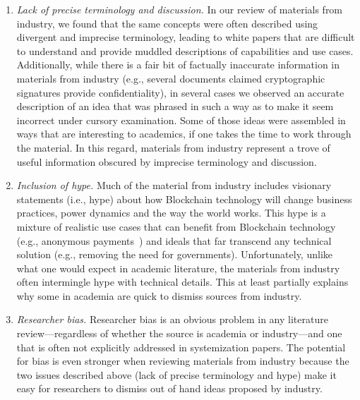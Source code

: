 \begin{enumerate}
	\item \emph{Lack of precise terminology and discussion.}
	In our review of materials from industry, we found that the same concepts were often described using divergent and imprecise terminology, leading to white papers that are difficult to understand and provide muddled descriptions of capabilities and use cases.
	Additionally, while there is a fair bit of factually inaccurate information in materials from industry (e.g., several documents claimed cryptographic signatures provide confidentiality), in several cases we  observed an accurate description of an idea that was phrased in such a way as to make it seem incorrect under cursory examination. Some of those ideas were assembled in ways that are interesting to academics, if one takes the time to work through the material.
	In this regard, materials from industry represent a trove of useful information obscured by imprecise terminology and discussion.
	
	\item \emph{Inclusion of hype.}
	Much of the material from industry includes visionary statements (i.e., hype) about how Blockchain technology will change business practices, power dynamics and the way the world works.
	This hype is a mixture of realistic use cases that can benefit from Blockchain technology (e.g., anonymous payments~\cite{chaum1988untraceable}) and ideals that far transcend any technical solution (e.g., removing the need for governments).
	Unfortunately, unlike what one would expect in academic literature, the materials from industry often intermingle hype with technical details. This at least partially explains why some in academia are quick to dismiss sources from industry.
	
	\item \emph{Researcher bias.}	
	Researcher bias is an obvious problem in any literature review---regardless of whether the source is academia or industry---and one that is often not explicitly addressed in systemization papers.
	The potential for bias is even stronger when reviewing materials from industry because the two issues described above (lack of precise terminology and hype) make it easy for researchers to dismiss out of hand ideas proposed by industry.
	
\end{enumerate}

